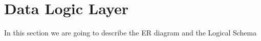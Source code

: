 \section{Data Logic Layer}

In this section we are going to describe the ER diagram and the Logical Schema



